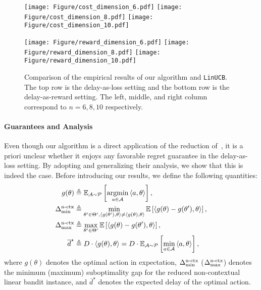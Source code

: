 \begin{figure*}[t]
\centering

\texttt{[image: Figure/cost\_dimension\_6.pdf]}
\texttt{[image: Figure/cost\_dimension\_8.pdf]}
\texttt{[image: Figure/cost\_dimension\_10.pdf]}

\texttt{[image: Figure/reward\_dimension\_6.pdf]}
\texttt{[image: Figure/reward\_dimension\_8.pdf]}
\texttt{[image: Figure/reward\_dimension\_10.pdf]}
\caption{Comparison of the empirical results of our algorithm and \texttt{LinUCB}. The top row is the delay-as-loss setting and the bottom row is the delay-as-reward setting. The left, middle, and right column correspond to $n=6,8,10$ respectively.}
\label{fig:synthetic_dataset}
\end{figure*}

\paragraph{Guarantees and Analysis}
Even though our algorithm is a direct application of the reduction of~\citet{hanna2023contexts}, it is a priori unclear whether it enjoys any favorable regret guarantee in the delay-as-loss setting.
By adopting and generalizing their analysis, we show that this is indeed the case.
Before introducing our results, we define the following quantities:
    \begin{align*}
        g(\theta) &\triangleq \mathbb{E}_{{\mathcal{A}}\sim {\mathcal{P}}}\left[\operatorname*{argmin}_{a\in{\mathcal{A}}}\left\langle {a,\theta} \right\rangle\right],\\
        \Delta_{\min}^{\text{n-ctx}} &\triangleq\min_{\theta'\in \Theta', \left\langle {g(\theta'),\theta} \right\rangle\neq \left\langle { g(\theta),\theta} \right\rangle}\mathbb{E}\left[\left\langle {g(\theta)-g(\theta'),\theta} \right\rangle\right],\\
        \Delta_{\max}^{\text{n-ctx}}  &\triangleq\max_{\theta'\in \Theta'}\mathbb{E}\left[\left\langle {g(\theta)-g(\theta'),\theta} \right\rangle\right],\\
        \overline{d}^{\star} &\triangleq D\cdot \left\langle {g(\theta),\theta} \right\rangle = D\cdot \mathbb{E}_{{\mathcal{A}}\sim {\mathcal{P}}}\left[\min_{a\in {\mathcal{A}}}\left\langle {a,\theta} \right\rangle\right],
    \end{align*}
    where $g(\theta)$ denotes the optimal action in expectation, $\Delta_{\min}^{\text{n-ctx}}$ ($\Delta_{\max}^{\text{n-ctx}}$) denotes the minimum (maximum) suboptimality gap for the reduced non-contextual linear bandit instance, and $\overline{d}^\star$ denotes the expected delay of the optimal action.

